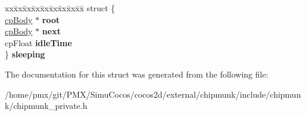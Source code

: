 \begin{DoxyCompactItemize}
\begin{tabbing}
\end{tabbing}\item 
\mbox{\label{structcpBody_a2957b46d018bb46558762170621d1577}} 
\begin{tabbing}
xx\=xx\=xx\=xx\=xx\=xx\=xx\=xx\=xx\=\kill
struct \{\\
\>\hyperlink{structcpBody}{cpBody} $\ast$ {\bfseries root}\\
\>\hyperlink{structcpBody}{cpBody} $\ast$ {\bfseries next}\\
\>cpFloat {\bfseries idleTime}\\
\} {\bfseries sleeping}\\

\end{tabbing}\end{DoxyCompactItemize}


The documentation for this struct was generated from the following file\+:\begin{DoxyCompactItemize}
\item 
/home/pmx/git/\+P\+M\+X/\+Simu\+Cocos/cocos2d/external/chipmunk/include/chipmunk/chipmunk\+\_\+private.\+h\end{DoxyCompactItemize}
